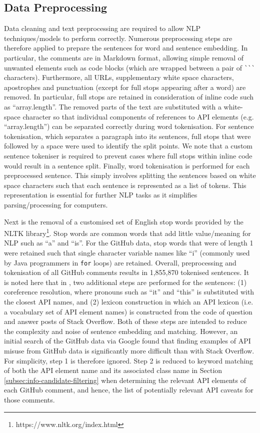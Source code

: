 \subsection{Data Preprocessing}
\label{subsec:info-data-preprocess}
Data cleaning and text preprocessing are required to allow NLP techniques/models to perform correctly. Numerous preprocessing steps are therefore applied to prepare the sentences for word and sentence embedding. In particular, the comments are in Markdown format, allowing simple removal of unwanted elements such as code blocks (which are wrapped between a pair of \lstinline{```} characters). Furthermore, all URLs, supplementary white space characters, apostrophes and punctuation (except for full stops appearing after a word) are removed. In particular, full stops are retained in consideration of inline code such as ``array.length''. The removed parts of the text are substituted with a white-space character so that individual components of references to API elements (e.g. ``array.length'') can be separated correctly during word tokenisation.  For sentence tokenisation, which separates a paragraph into its sentences, full stops that were followed by a space were used to identify the split points.  We note that a custom sentence tokeniser is required to prevent cases where full stops within inline code would result in a sentence split. Finally, word tokenisation is performed for each preprocessed sentence. This simply involves splitting the sentences based on white space characters such that each sentence is represented as a list of tokens. This representation is essential for further NLP tasks as it simplifies parsing/processing for computers. \bigbreak

Next is the removal of a customised set of English stop words provided by the NLTK library\footnote{https://www.nltk.org/index.html}. Stop words are common words that add little value/meaning for NLP such as ``a'' and ``is''. For the GitHub data, stop words that were of length 1 were retained such that single character variable names like ``i'' (commonly used by Java programmers in \lstinline{for} loops) are retained. Overall, preprocessing and tokenisation of all GitHub comments results in 1,855,870 tokenised sentences. It is noted here that in \cite{jiamou}, two additional steps are performed for the sentences: (1) coreference resolution, where pronouns such as ``it'' and ``this'' is substituted with the closest API names, and (2) lexicon construction in which an API lexicon (i.e. a vocabulary set of API element names) is constructed from the code of question and answer posts of Stack Overflow. Both of these steps are intended to reduce the complexity and noise of sentence embedding and matching. However, an initial search of the GitHub data via Google found that finding examples of API misuse from GitHub data is significantly more difficult than with Stack Overflow. For simplicity, step 1 is therefore ignored. Step 2 is reduced to keyword matching of both the API element name and its associated class name in Section \ref{subsec:info-candidate-filtering} when determining the relevant API elements of each GitHub comment, and hence, the list of potentially relevant API caveats for those comments.

